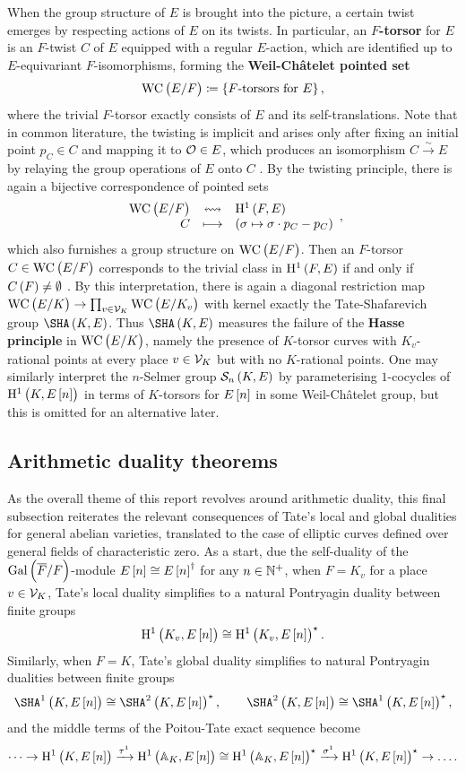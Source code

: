 When the group structure of $ E $ is brought into the picture, a certain twist emerges by respecting actions of $ E $ on its twists. In particular, an \textbf{$ F $-torsor} for $ E $ is an $ F $-twist $ C $ of $ E $ equipped with a regular $ E $-action, which are identified up to $ E $-equivariant $ F $-isomorphisms, forming the \textbf{Weil-Ch\^atelet pointed set}
$$ \WC{F} \coloneqq \cbr{\text{$ F $-torsors for} \ E}, $$
where the trivial $ F $-torsor exactly consists of $ E $ and its self-translations. Note that in common literature, the twisting is implicit and arises only after fixing an initial point $ p_C \in C $ and mapping it to $ \mathcal{O} \in E $, which produces an isomorphism $ C \xrightarrow{\sim} E $ by relaying the group operations of $ E $ onto $ C $ \cite[Proposition X.3.2]{Sil09}. By the twisting principle, there is again a bijective correspondence of pointed sets \cite[Theorem X.3.6]{Sil09}
$$ \bijection{\WC{F}}{\HE{F}}{C}{\br{\sigma \mapsto \sigma \cdot p_C - p_C}}, $$
which also furnishes a group structure on $ \WC{F} $. Then an $ F $-torsor $ C \in \WC{F} $ corresponds to the trivial class in $ \HE{F} $ if and only if $ C\br{F} \ne \emptyset $ \cite[Proposition X.3.3]{Sil09}. By this interpretation, there is again a diagonal restriction map $ \WC{K} \to \PV\WC{K_v} $ with kernel exactly the Tate-Shafarevich group $ \Sha $. Thus $ \Sha $ measures the failure of the \textbf{Hasse principle} in $ \WC{K} $, namely the presence of $ K $-torsor curves with $ K_v $-rational points at every place $ v \in \mathcal{V}_K $ but with no $ K $-rational points. One may similarly interpret the $ n $-Selmer group $ \Sel[n] $ by parameterising $ 1 $-cocycles of $ \HE[n]{K} $ in terms of $ K $-torsors for $ E\sbr{n} $ in some Weil-Ch\^atelet group, but this is omitted for an alternative later.

\pagebreak

\subsection{Arithmetic duality theorems}

As the overall theme of this report revolves around arithmetic duality, this final subsection reiterates the relevant consequences of Tate's local and global dualities for general abelian varieties, translated to the case of elliptic curves defined over general fields of characteristic zero. As a start, due the self-duality of the $ \AG{F} $-module $ E\sbr{n} \cong E\sbr{n}^\dagger $ for any $ n \in \mathbb{N}^+ $, when $ F = K_v $ for a place $ v \in \mathcal{V}_K $, Tate's local duality simplifies to a natural Pontryagin duality between finite groups
$$ \HE[n]{K_v} \cong \HE[n]{K_v}^\star. $$
Similarly, when $ F = K $, Tate's global duality simplifies to natural Pontryagin dualities between finite groups
$$ \Sha[K, E\sbr{n}] \cong \SHA^2\br{K, E\sbr{n}}^\star, \qquad \SHA^2\br{K, E\sbr{n}} \cong \Sha[K, E\sbr{n}]^\star, $$
and the middle terms of the Poitou-Tate exact sequence become
$$ \dots \to \HE[n]{K} \xrightarrow{\tau^1} \HE[n]{\AA_K} \cong \HE[n]{\AA_K}^\star \xrightarrow{\sigma^1} \HE[n]{K}^\star \to \dots. $$

